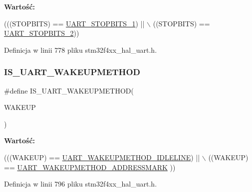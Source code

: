{\bfseries Wartość\+:}
\begin{DoxyCode}
(((STOPBITS) == \hyperlink{group___u_a_r_t___stop___bits_ga7cf97e555292d574de8abc596ba0e2ce}{UART\_STOPBITS\_1}) || \(\backslash\)
                                    ((STOPBITS) == \hyperlink{group___u_a_r_t___stop___bits_ga91616523380f7450aac6cb7e17f0c0f2}{UART\_STOPBITS\_2}))
\end{DoxyCode}


Definicja w linii 778 pliku stm32f4xx\+\_\+hal\+\_\+uart.\+h.

\mbox{\label{group___u_a_r_t___private___macros_ga6fea268c66482e36fb38844b808cf695}} 
\subsubsection{\texorpdfstring{I\+S\+\_\+\+U\+A\+R\+T\+\_\+\+W\+A\+K\+E\+U\+P\+M\+E\+T\+H\+OD}{IS\_UART\_WAKEUPMETHOD}}
{\footnotesize\ttfamily \#define I\+S\+\_\+\+U\+A\+R\+T\+\_\+\+W\+A\+K\+E\+U\+P\+M\+E\+T\+H\+OD(\begin{DoxyParamCaption}\item[{}]{W\+A\+K\+E\+UP }\end{DoxyParamCaption})}

{\bfseries Wartość\+:}
\begin{DoxyCode}
(((WAKEUP) == \hyperlink{group___u_a_r_t___wake_up__functions_ga2411ed44c5d82db84c5819e1e2b5b8b3}{UART\_WAKEUPMETHOD\_IDLELINE}) || \(\backslash\)
                                      ((WAKEUP) == \hyperlink{group___u_a_r_t___wake_up__functions_ga4c6935f26f8f2a9fe70fd6306a9882cb}{UART\_WAKEUPMETHOD\_ADDRESSMARK}
      ))
\end{DoxyCode}


Definicja w linii 796 pliku stm32f4xx\+\_\+hal\+\_\+uart.\+h.

\mbox{\label{group___u_a_r_t___private___macros_ga4fb6c975f14bd141ec282820823a2fff}} 
